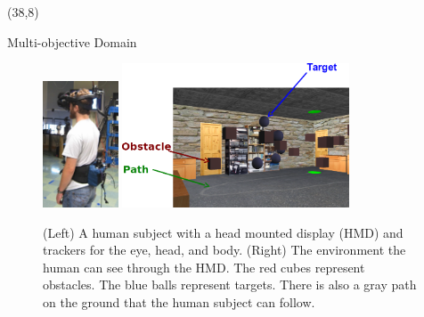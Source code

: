 \documentclass[final]{beamer}
\begin{document}
\begin{frame}{}
\begin{textblock}{37}(38,8)
\begin{block}{Multi-objective Domain}
\begin{figure}[h]
\centering
\includegraphics[width=0.2\textwidth]{human.jpg}
\includegraphics[width=0.6\textwidth]{env.png}
\caption{(Left) A human subject with a head mounted display (HMD) and trackers
for the eye, head, and body.  (Right) The environment the human can see through
the HMD.  The red cubes represent obstacles. The blue balls represent targets.
There is also a gray path on the ground that the human subject can follow.}
\label{fig:avatar}
\end{figure}
\end{block}


\end{textblock}
\end{frame}
\end{document}
